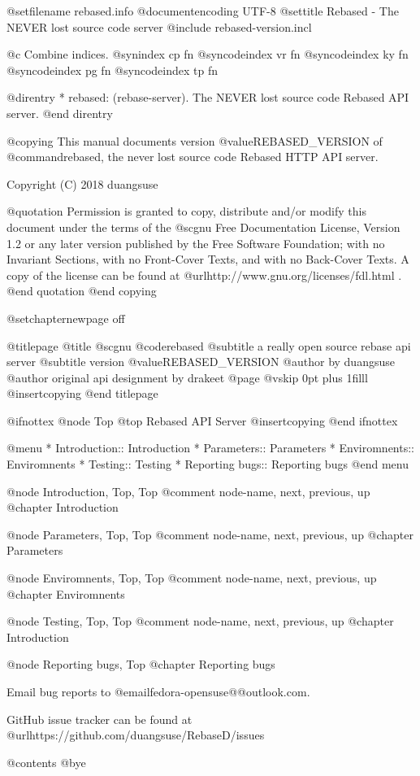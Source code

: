 @setfilename rebased.info
@documentencoding UTF-8
@settitle Rebased - The NEVER lost source code server
@include rebased-version.incl

@c Combine indices.
@synindex cp fn
@syncodeindex vr fn
@syncodeindex ky fn
@syncodeindex pg fn
@syncodeindex tp fn

@direntry
* rebased: (rebase-server). The NEVER lost source code Rebased API server.
@end direntry

@copying
This manual documents version @value{REBASED_VERSION} of
@command{rebased}, the never lost source code Rebased HTTP API server.

Copyright (C) 2018
duangsuse

@quotation
Permission is granted to copy, distribute and/or modify this document
under the terms of the @sc{gnu} Free Documentation License,
Version 1.2 or any later version published by the Free Software Foundation;
with no Invariant Sections, with no Front-Cover Texts,
and with no Back-Cover Texts.
A copy of the license can be found at
@url{http://www.gnu.org/licenses/fdl.html} .
@end quotation
@end copying

@setchapternewpage off

@titlepage
@title @sc{gnu} @code{rebased}
@subtitle a really open source rebase api server
@subtitle version @value{REBASED_VERSION}
@author by duangsuse
@author original api designment by drakeet
@page
@vskip 0pt plus 1filll
@insertcopying
@end titlepage

@ifnottex
@node Top
@top Rebased API Server
@insertcopying
@end ifnottex

@menu
* Introduction::                Introduction
* Parameters::                  Parameters
* Enviromnents::                Enviromnents
* Testing::                     Testing
* Reporting bugs::              Reporting bugs
@end menu

@node Introduction, Top, Top
@comment node-name, next, previous, up
@chapter Introduction

@node Parameters, Top, Top
@comment node-name, next, previous, up
@chapter Parameters

@node Enviromnents, Top, Top
@comment node-name, next, previous, up
@chapter Enviromnents

@node Testing, Top, Top
@comment node-name, next, previous, up
@chapter Introduction

@node Reporting bugs, Top
@chapter Reporting bugs

Email bug reports to @email{fedora-opensuse@@outlook.com}.

GitHub issue tracker can be found at @url{https://github.com/duangsuse/RebaseD/issues}

@contents
@bye
